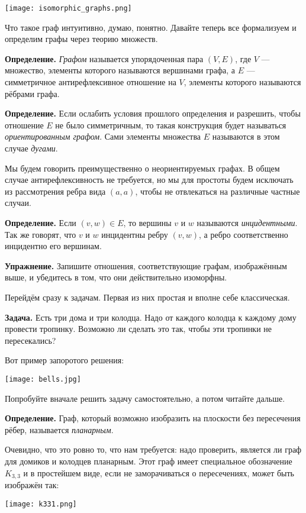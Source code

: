 \texttt{[image: isomorphic\_graphs.png]}

Что такое граф интуитивно, думаю, понятно. Давайте теперь все формализуем и определим графы через теорию множеств.

{\bfseries Определение.} {\slshape Графом} называется упорядоченная пара $(V, E)$, где $V$ — множество, элементы которого называются вершинами графа, а $E$ — симметричное антирефлексивное отношение на $V$, элементы которого называются рёбрами графа.

{\bfseries Определение.} Если ослабить условия прошлого определения и разрешить, чтобы отношение $E$ не было симметричным, то такая конструкция будет называться {\slshape ориентированным графом}. Сами элементы множества $E$ называются в этом случае {\slshape дугами}.

Мы будем говорить преимущественно о неориентируемых графах. В общем случае антирефлексивность не требуется, но мы для простоты будем исключать из рассмотрения ребра вида $(a, a)$, чтобы не отвлекаться на различные частные случаи.

{\bfseries Определение.} Если $(v, w) \in E$, то вершины $v$ и $w$ называются {\slshape инцидентными}. Так же говорят, что $v$ и $w$ инцидентны ребру $(v, w)$, а ребро соответственно инцидентно его вершинам.

{\bfseries Упражнение.} Запишите отношения, соответствующие графам, изображённым выше, и убедитесь в том, что они действительно изоморфны.

Перейдём сразу к задачам. Первая из них простая и вполне себе классическая.

{\bfseries Задача.} Есть три дома и три колодца. Надо от каждого колодца к каждому дому провести тропинку. Возможно ли сделать это так, чтобы эти тропинки не пересекались?

Вот пример запоротого решения:

\texttt{[image: bells.jpg]}

Попробуйте вначале решить задачу самостоятельно, а потом читайте дальше.

{\bfseries Определение.} Граф, который возможно изобразить на плоскости без пересечения рёбер, называется {\slshape планарным}.

Очевидно, что это ровно то, что нам требуется: надо проверить, является ли граф для домиков и колодцев планарным. Этот граф имеет специальное обозначение $K_{3, 3}$ и в простейшем виде, если не заморачиваться о пересечениях, может быть изображён так:

\texttt{[image: k331.png]}


